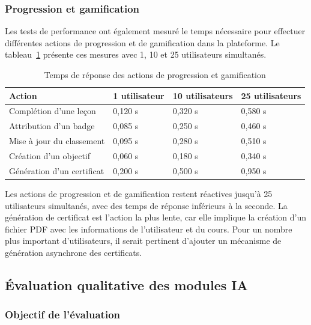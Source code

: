 \subsubsection{Progression et gamification}

Les tests de performance ont également mesuré le temps nécessaire pour effectuer différentes actions de progression et de gamification dans la plateforme. Le tableau~\ref{tab:ch3_perf_gamification} présente ces mesures avec 1, 10 et 25 utilisateurs simultanés.

\begin{table}[H]
    \centering
    \caption{Temps de réponse des actions de progression et gamification}
    \label{tab:ch3_perf_gamification}
    \begin{tabularx}{\textwidth}{|p{4cm}|X|X|X|}
        \hline
        \textbf{Action} & \textbf{1 utilisateur} & \textbf{10 utilisateurs} & \textbf{25 utilisateurs} \\
        \hline
        Complétion d'une leçon & 0,120 s & 0,320 s & 0,580 s \\
        \hline
        Attribution d'un badge & 0,085 s & 0,250 s & 0,460 s \\
        \hline
        Mise à jour du classement & 0,095 s & 0,280 s & 0,510 s \\
        \hline
        Création d'un objectif & 0,060 s & 0,180 s & 0,340 s \\
        \hline
        Génération d'un certificat & 0,200 s & 0,500 s & 0,950 s \\
        \hline
    \end{tabularx}
\end{table}

Les actions de progression et de gamification restent réactives jusqu'à 25 utilisateurs simultanés, avec des temps de réponse inférieurs à la seconde. La génération de certificat est l'action la plus lente, car elle implique la création d'un fichier PDF avec les informations de l'utilisateur et du cours. Pour un nombre plus important d'utilisateurs, il serait pertinent d'ajouter un mécanisme de génération asynchrone des certificats.

\subsection{Évaluation qualitative des modules IA}

\subsubsection{Objectif de l'évaluation}

